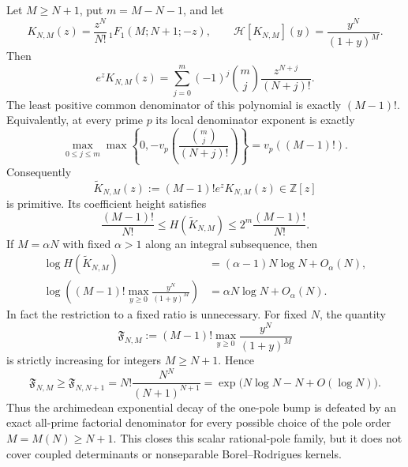 \begin{proposition}
\label{prop:borel-laguerre-adelic-wall}
Let $M\geq N+1$, put $m=M-N-1$, and let
\[
 K_{N,M}(z)=\frac{z^N}{N!}\,{}_1F_1(M;N+1;-z),
 \qquad
 \mathcal H[K_{N,M}](y)=\frac{y^N}{(1+y)^M}.
\]
Then
\begin{equation}\label{eq:borel-laguerre-clearing-expansion}
 e^zK_{N,M}(z)
 =\sum_{j=0}^{m}(-1)^j\binom mj
   \frac{z^{N+j}}{(N+j)!}.
\end{equation}
The least positive common denominator of this polynomial is exactly
$(M-1)!$.  Equivalently, at every prime $p$ its local denominator
exponent is exactly
\begin{equation}\label{eq:borel-laguerre-local-wall}
 \max_{0\leq j\leq m}
 \max\!\left\{0,-v_p\!\left(
 \frac{\binom mj}{(N+j)!}\right)\right\}
 =v_p((M-1)!).
\end{equation}
Consequently
\begin{equation}\label{eq:borel-laguerre-primitive-polynomial}
 \widetilde K_{N,M}(z):=(M-1)!e^zK_{N,M}(z)
 \in\mathbb Z[z]
\end{equation}
is primitive.  Its coefficient height satisfies
\begin{equation}\label{eq:borel-laguerre-height-bounds}
 \frac{(M-1)!}{N!}
 \leq H(\widetilde K_{N,M})
 \leq 2^m\frac{(M-1)!}{N!}.
\end{equation}
If $M=\alpha N$ with fixed $\alpha>1$ along an integral subsequence, then
\begin{align}
 \log H(\widetilde K_{N,M})
 &=(\alpha-1)N\log N+O_\alpha(N),
 \label{eq:borel-laguerre-height-asymptotic}\\
 \log\!\left((M-1)!
 \max_{y\geq0}\frac{y^N}{(1+y)^M}\right)
 &=\alpha N\log N+O_\alpha(N).
 \label{eq:borel-laguerre-normalized-bump}
\end{align}
In fact the restriction to a fixed ratio is unnecessary.  For fixed
$N$, the quantity
\[
 \mathfrak F_{N,M}:=(M-1)!
 \max_{y\geq0}\frac{y^N}{(1+y)^M}
\]
is strictly increasing for integers $M\geq N+1$.  Hence
\begin{equation}\label{eq:borel-laguerre-uniform-wall}
 \mathfrak F_{N,M}
 \geq \mathfrak F_{N,N+1}
 =N!\frac{N^N}{(N+1)^{N+1}}
 =\exp\bigl(N\log N-N+O(\log N)\bigr).
\end{equation}
Thus the archimedean exponential decay of the one-pole bump is defeated
by an exact all-prime factorial denominator for every possible choice of
the pole order $M=M(N)\geq N+1$.  This closes this scalar rational-pole
family, but it does not cover coupled determinants or nonseparable
Borel--Rodrigues kernels.
\end{proposition}

